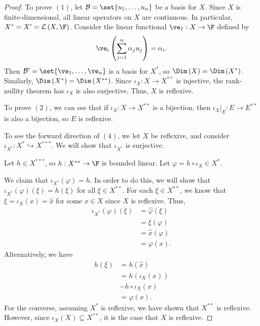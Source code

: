 \documentclass[10pt]{mypackage}
\begin{document}
\begin{proof}
  To prove $(1)$, let $\mathcal{B} = \set{u_1,\dots,u_n}$ be a basis for $X$. Since $X$ is finite-dimensional, all linear operators on $X$ are continuous. In particular, $X^{\ast} = X' = \mathcal{L}\left(X,\F\right)$. Consider the linear functional $\ve_I: X\rightarrow \F$ defined by
  \begin{align*}
    \ve_i\left(\sum_{j=1}^{n}\alpha_ju_j\right) = \alpha_i.
  \end{align*}
  Then $\mathcal{B}' = \set{\ve_1,\dots,\ve_n}$ is a basis for $X^{\ast}$, so $\Dim\left(X\right) = \Dim\left(X^{\ast}\right)$. Similarly, $\Dim\left(X^{\ast}\right) = \Dim\left(X^{\ast\ast}\right)$. Since $\iota_X: X\rightarrow X^{\ast\ast}$ is injective, the rank-nullity theorem has $\iota_X$ is also surjective. Thus, $X$ is reflexive.\newline
  
  To prove $(2)$, we can see that if $\iota_X: X\rightarrow X^{\ast\ast}$ is a bijection, then $\iota_{X}|_{E}: E\rightarrow E^{\ast\ast}$ is also a bijection, so $E$ is reflexive.\newline

  To see the forward direction of $(4)$, we let $X$ be reflexive, and consider $\iota_{X^{\ast}}: X^{\ast}\hookrightarrow X^{\ast\ast\ast}$. We will show that $\iota_{X^{\ast}}$ is surjective.\newline

  Let $h\in X^{\ast\ast\ast}$, so $h: X^{\ast\ast}\rightarrow \F$ is bounded linear. Let $\varphi = h\circ \iota_X\in X^{\ast}$.\newline

  We claim that $\iota_{X^{\ast}}\left(\varphi\right) = h$. In order to do this, we will show that $\iota_{X^{\ast}}\left(\varphi\right)\left(\xi\right) = h\left(\xi\right)$ for all $\xi\in X^{\ast\ast}$. For each $\xi\in X^{\ast\ast}$, we know that $\xi = \iota_{X}\left(x\right) = \hat{x}$ for some $x\in X$ since $X$ is reflexive. Thus,
  \begin{align*}
    \iota_{X^{\ast}}\left(\varphi\right)\left(\xi\right) &= \hat{\varphi}\left(\xi\right)\\
                                                         &= \xi\left(\varphi\right)\\
                                                         &= \hat{x}\left(\varphi\right)\\
                                                         &= \varphi(x).
  \end{align*}
  Alternatively, we have
  \begin{align*}
    h\left(\xi\right) &= h\left(\hat{x}\right)\\
                      &= h\left(\iota_X\left(x\right)\right)\\
                      &- h\circ \iota_X\left(x\right)\\
                      &= \varphi(x).
  \end{align*}
  For the converse, assuming $X^{\ast}$ is reflexive, we have shown that $X^{\ast\ast}$ is reflexive. However, since $\iota_X\left(X\right) \subseteq X^{\ast\ast}$, it is the case that $X$ is reflexive.
\end{proof}
\end{document}
